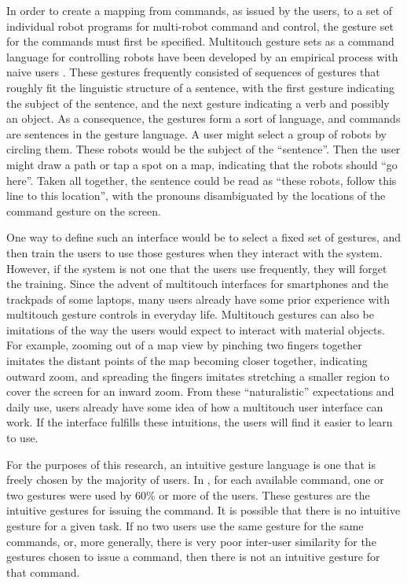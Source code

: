 \documentclass[]{article}
\begin{document}
In order to create a mapping from commands, as issued by the users, to a set of individual robot programs for multi-robot command and control, the gesture set for the commands must first be specified. 
Multitouch gesture sets as a command language for controlling robots have been developed by an empirical process with naive users \cite{Micire:2009:ANG:1731903.1731912}. 
These gestures frequently consisted of sequences of gestures that roughly fit the linguistic structure of a sentence, with the first gesture indicating the subject of the sentence, and the next gesture indicating a verb and possibly an object. 
As a consequence, the gestures form a sort of language, and commands are sentences in the gesture language.
A user might select a group of robots by circling them. 
These robots would be the subject of the ``sentence''.
Then the user might draw a path or tap a spot on a map, indicating that the robots should ``go here''. 
Taken all together, the sentence could be read as ``these robots, follow this line to this location'', with the pronouns disambiguated by the locations of the command gesture on the screen.

One way to define such an interface would be to select a fixed set of gestures, and then train the users to use those gestures when they interact with the system. 
However, if the system is not one that the users use frequently, they will forget the training. 
Since the advent of multitouch interfaces for smartphones and the trackpads of some laptops, many users already have some prior experience with multitouch gesture controls in everyday life. 
Multitouch gestures can also be imitations of the way the users would expect to interact with material objects. 
For example, zooming out of a map view by pinching two fingers together imitates the distant points of the map becoming closer together, indicating outward zoom, and spreading the fingers imitates stretching a smaller region to cover the screen for an inward zoom. 
From these ``naturalistic'' expectations and daily use, users already have some idea of how a multitouch user interface can work. 
If the interface fulfills these intuitions, the users will find it easier to learn to use. 

For the purposes of this research, an intuitive gesture language is one that is freely chosen by the majority of users. 
In \cite{Micire:2009:ANG:1731903.1731912}, for each available command, one or two gestures were used by 60\% or more of the users. 
These gestures are the intuitive gestures for issuing the command. 
It is possible that there is no intuitive gesture for a given task.
If no two users use the same gesture for the same commands, or, more generally, there is very poor inter-user similarity for the gestures chosen to issue a command, then there is not an intuitive gesture for that command.
\end{document}
